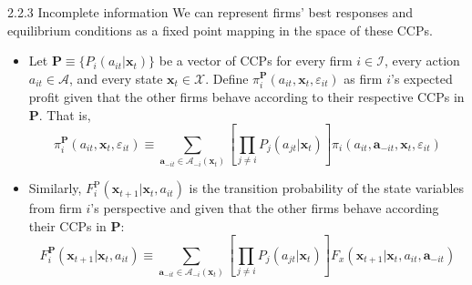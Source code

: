 \documentclass[aspectratio=169]{beamer}  %
\begin{document}
\begin{frame}{2.2.3 Incomplete information}
We can represent firms' best responses and equilibrium conditions as a fixed point mapping in the space of these CCPs.
    \begin{itemize}
        \item  Let \(\mathbf{P} \equiv \{P_i(a_{it}|\mathbf{x}_t)\}\) be a vector of CCPs for every firm \(i \in \mathcal{I}\), every action \(a_{it} \in \mathcal{A}\), and every state \(\mathbf{x}_t \in \mathcal{X}\). Define \(\pi_i^\mathbf{P}(a_{it}, \mathbf{x}_t, \varepsilon_{it})\) as firm \(i\)'s expected profit given that the other firms behave according to their respective CCPs in \(\mathbf{P}\). That is,
        \begin{equation}\label{4}
            \pi_i^\mathbf{P}(a_{it}, \mathbf{x}_t, \varepsilon_{it}) \equiv \sum_{\mathbf{a}_{-it} \in \mathcal{A}_{-i}(\mathbf{x}_t)} \left[ \prod_{j \neq i} P_j(a_{jt}|\mathbf{x}_t) \right] \pi_i(a_{it}, \mathbf{a}_{-it}, \mathbf{x}_t, \varepsilon_{it})
        \end{equation}

        \item Similarly, $F_i^\text{P}(\mathbf{x}_{t+1}|\mathbf{x}_t, a_{it})$ is the transition probability of the state variables from firm \(i\)’s perspective and given that the other firms behave according their CCPs in $\mathbf{P}$:
        \begin{equation}\label{5}
            F_i^\mathbf{P}(\mathbf{x}_{t+1}|\mathbf{x}_t, a_{it}) \equiv \sum_{\mathbf{a}_{-it} \in \mathcal{A}_{-i}(\mathbf{x}_t)} \left[ \prod_{j \neq i} P_j(a_{jt}|\mathbf{x}_t) \right] F_x(\mathbf{x}_{t+1}|\mathbf{x}_t, a_{it}, \mathbf{a}_{-it})
        \end{equation}

    \end{itemize}
\end{frame}
\end{document}
